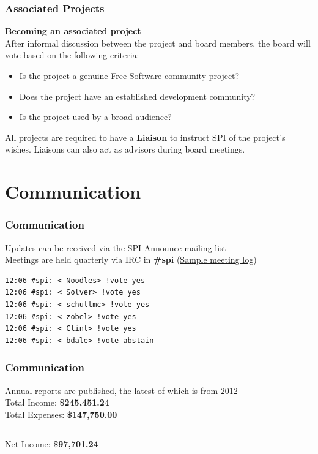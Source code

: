 \documentclass[10pt, compress]{beamer}
\begin{document}
\begin{frame}[fragile]
  \frametitle{Associated Projects}
    \textbf{Becoming an associated project}
    \\ \vspace{4mm}
    After informal discussion between the project and board members, the board will vote based on the following criteria:
    
    \begin{itemize}
      \item Is the project a genuine Free Software community project?
      \item Does the project have an established development community?
      \item Is the project used by a broad audience?
    \end{itemize}
    \vspace{1mm}
    All projects are required to have a \textbf{Liaison} to instruct SPI of the project's wishes. Liaisons can also act as advisors during board meetings.
\end{frame}


\section{Communication}


\begin{frame}[fragile]
  \frametitle{Communication}
    Updates can be received via the  \href{http://lists.spi-inc.org/listinfo/spi-announce}{\alert{SPI-Announce}} mailing list
    \\ \vspace{4mm}
    Meetings are held quarterly via IRC in \textbf{\#spi} (\href{http://www.spi-inc.org/meetings/logs/2014/2014-01-09-log.txt}{\alert{Sample meeting log}})
    \\ \vspace{4mm}
    \begin{verbatim}
12:06 #spi: < Noodles> !vote yes
12:06 #spi: < Solver> !vote yes
12:06 #spi: < schultmc> !vote yes
12:06 #spi: < zobel> !vote yes
12:06 #spi: < Clint> !vote yes
12:06 #spi: < bdale> !vote abstain
    \end{verbatim}
\end{frame}



\begin{frame}[fragile]
  \frametitle{Communication}
  \begin{center}
    Annual reports are published, the latest of which is   \href{http://spi-inc.org/corporate/annual-reports/2012.pdf}{\alert{from 2012}}
    \\ \vspace{8mm}
    Total Income: \textbf{\$245,451.24}
    \\
    Total Expenses: \textbf{\$147,750.00}
    \\ \vspace{6mm}
    \hrule
    \vspace{3mm}
    Net Income: \textbf{\$97,701.24}
  \end{center}
\end{frame}
\end{document}
